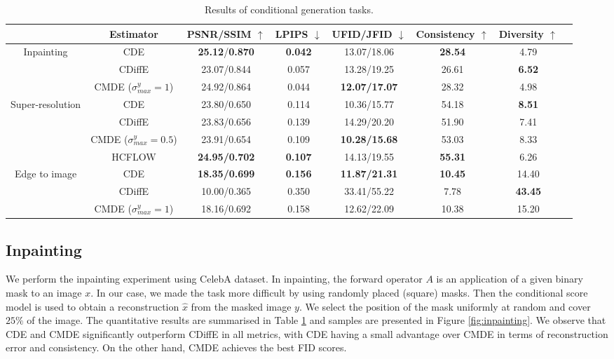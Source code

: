 \begin{table}
  \begin{center}
  \caption{Results of conditional generation tasks.}
  \label{tbl:results}
  \begin{tabular}{cccccccc}
  \toprule
  &Estimator & PSNR/SSIM $\uparrow$  & LPIPS $\downarrow$ & UFID/JFID $\downarrow$ & Consistency $\uparrow$ & Diversity $\uparrow$ \\
  \midrule
  \multirow{3}{*}{Inpainting} 
  &CDE & \textbf{25.12}/\textbf{0.870}  & \textbf{0.042} & 13.07/18.06 & \textbf{28.54} & 4.79  \\
  &CDiffE & 23.07/0.844   & 0.057 & 13.28/19.25 &  26.61 & \textbf{6.52}   \\
  &CMDE ($\sigma^y_{max} = 1$) & 24.92/0.864  & 0.044 & \textbf{12.07/17.07} & 28.32 & 4.98  \\
  \midrule
  \multirow{4}{*}{Super-resolution} 
  &CDE & 23.80/0.650  & 0.114 & 10.36/15.77 & 54.18 & \textbf{8.51}  \\
  &CDiffE & 23.83/0.656  & 0.139 & 14.29/20.20 & 51.90 & 7.41  \\
  &CMDE ($\sigma^y_{max} = 0.5$) & 23.91/0.654  & 0.109 & \textbf{10.28/15.68} & 53.03 & 8.33  \\
  &HCFLOW & \textbf{24.95/0.702} & \textbf{0.107} & 14.13/19.55 & \textbf{55.31} & 6.26 \\
  \midrule
  \multirow{3}{*}{Edge to image} 
  &CDE & \textbf{18.35/0.699}  & \textbf{0.156} & \textbf{11.87/21.31} & \textbf{10.45} & 14.40 \\
  &CDiffE & 10.00/0.365   & 0.350 & 33.41/55.22  & 7.78 & \textbf{43.45} \\
  &CMDE ($\sigma^y_{max} = 1$) & 18.16/0.692  & 0.158 & 12.62/22.09 & 10.38 & 15.20  \\
  \bottomrule
  \end{tabular}
  \end{center}
\end{table}

\subsection{Inpainting}

We perform the inpainting experiment using CelebA dataset. In inpainting, the forward operator $A$ is an application of a given binary mask to an image $x$.  In our case, we made the task more difficult by using randomly placed (square) masks. Then the conditional score model is used to obtain a reconstruction $\hat{x}$ from the masked image $y$. We select the position of the mask uniformly at random and cover $25\%$ of the image. The quantitative results are summarised in Table \ref{tbl:results} and samples are presented in Figure \ref{fig:inpainting}. We observe that CDE and CMDE significantly outperform CDiffE in all metrics, with CDE having a small advantage over CMDE in terms of reconstruction error and consistency. On the other hand, CMDE achieves the best FID scores.

